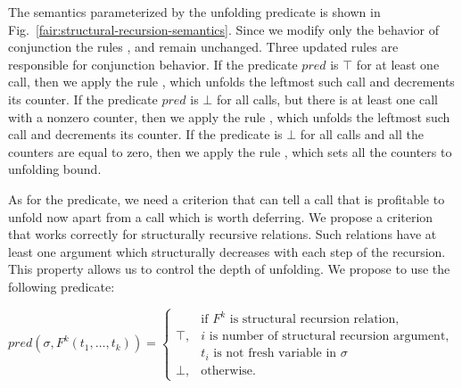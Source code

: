 The semantics parameterized by the unfolding predicate is shown in Fig.~\ref{fair:structural-recursion-semantics}. Since we modify only the behavior of conjunction the rules ,
 and  remain unchanged. Three updated rules are responsible for conjunction behavior. If the predicate $pred$ is $\top$ for at least one call, then we
apply the rule , which unfolds the leftmost such call and decrements its counter. If the predicate $pred$ is $\bot$ for all calls, but there is at least one
call with a nonzero counter, then we apply the rule , which unfolds the leftmost such call and decrements its counter. If the predicate is $\bot$ for all calls
and all the counters are equal to zero, then we apply the rule , which sets all the counters to unfolding bound.

As for the predicate, we need a criterion that can tell a call that is profitable to unfold now apart from a call which is worth deferring. We propose a criterion that works correctly
for structurally recursive relations. Such relations have at least one argument which structurally decreases with each step of the recursion. This property allows us to control the depth
of unfolding. We propose to use the following predicate:

\[
pred(\sigma, F^k(t_1, \ldots, t_k)) = \left\{
\begin{array}{cl}
      & \mbox{if } F^k \mbox{ is structural recursion relation, } \\
\top, & i \mbox { is number of structural recursion argument, } \\
      & t_i \mbox { is not fresh variable in } \sigma \\
\bot, & \mbox{otherwise.}
\end{array}
\right.
\]


